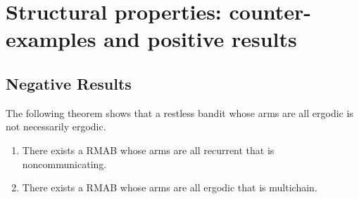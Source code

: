 \section{Structural properties: counter-examples and positive results}

\subsection{Negative Results}
The following theorem shows that a restless bandit whose arms are all ergodic is not necessarily ergodic.
\begin{thm}
    \begin{enumerate}[label=(\roman*)]
        \item \label{thm:not_ergodic} There exists a RMAB whose arms are all recurrent that is noncommunicating. %
        \item \label{thm:ergodic_arms_multichain_RB} There exists a RMAB whose arms are all ergodic that is multichain.
    \end{enumerate}
\end{thm}

